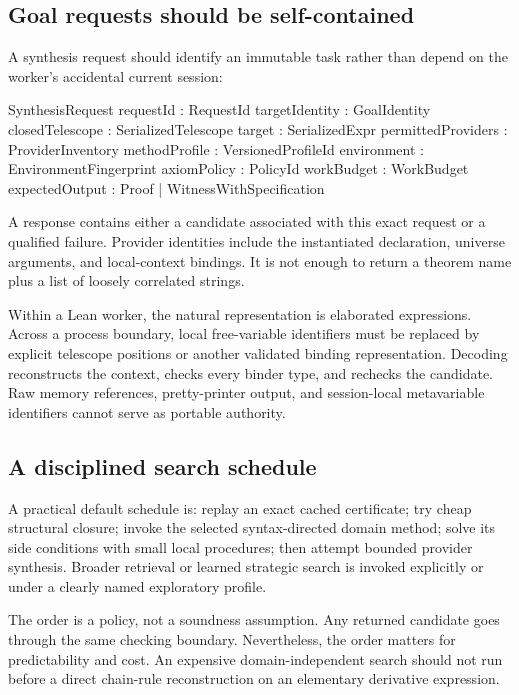 \documentclass[11pt,a4paper]{article}
\theoremstyle{remark}
\begin{document}
\subsection{Goal requests should be self-contained}
A synthesis request should identify an immutable task rather than depend on the worker's accidental current session:
\Needspace{166pt}
\begin{code}
SynthesisRequest {
  requestId          : RequestId
  targetIdentity     : GoalIdentity
  closedTelescope    : SerializedTelescope
  target             : SerializedExpr
  permittedProviders : ProviderInventory
  methodProfile      : VersionedProfileId
  environment        : EnvironmentFingerprint
  axiomPolicy        : PolicyId
  workBudget         : WorkBudget
  expectedOutput     : Proof | WitnessWithSpecification
}
\end{code}
A response contains either a candidate associated with this exact request or a qualified failure. Provider identities include the instantiated declaration, universe arguments, and local-context bindings. It is not enough to return a theorem name plus a list of loosely correlated strings.

Within a Lean worker, the natural representation is elaborated expressions. Across a process boundary, local free-variable identifiers must be replaced by explicit telescope positions or another validated binding representation. Decoding reconstructs the context, checks every binder type, and rechecks the candidate. Raw memory references, pretty-printer output, and session-local metavariable identifiers cannot serve as portable authority.

\subsection{A disciplined search schedule}
A practical default schedule is: replay an exact cached certificate; try cheap structural closure; invoke the selected syntax-directed domain method; solve its side conditions with small local procedures; then attempt bounded provider synthesis. Broader retrieval or learned strategic search is invoked explicitly or under a clearly named exploratory profile.

The order is a policy, not a soundness assumption. Any returned candidate goes through the same checking boundary. Nevertheless, the order matters for predictability and cost. An expensive domain-independent search should not run before a direct chain-rule reconstruction on an elementary derivative expression.
\end{document}
